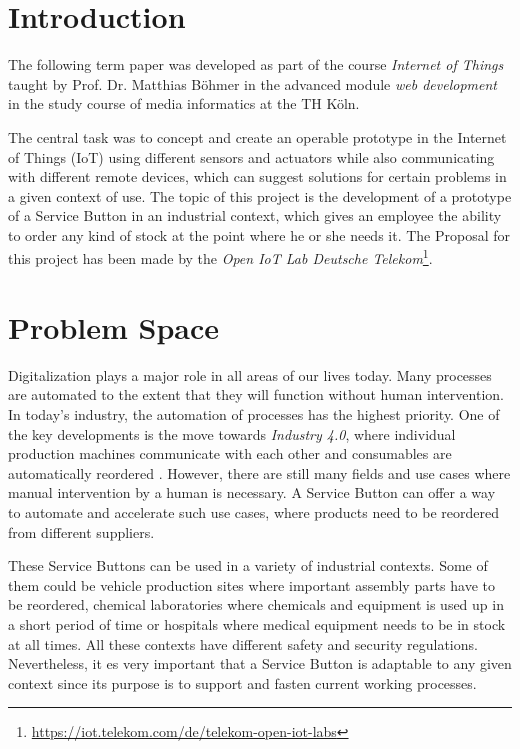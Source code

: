 \section{Introduction}
\label{sec:Intro}

The following term paper was developed as part of the course \textit{Internet of Things} taught by Prof. Dr. Matthias Böhmer in the advanced module \textit{web development} in the study course of media informatics at the TH Köln.

The central task was to concept and create an operable prototype in the Internet of Things (IoT) using different sensors and actuators while also communicating with different remote devices, which can suggest solutions for certain problems in a given context of use. The topic of this project is the development of a prototype of a Service Button in an industrial context, which gives an employee the ability to order any kind of stock at the point where he or she needs it. The Proposal for this project has been made by the \textit{Open IoT Lab Deutsche Telekom}\footnote{\url{https://iot.telekom.com/de/telekom-open-iot-labs}}.

\section{Problem Space}
\label{sec:Problem-Space}

Digitalization plays a major role in all areas of our lives today. Many processes are automated to the extent that they will function without human intervention. In today's industry, the automation of processes has the highest priority.
One of the key developments is the move towards \textit{Industry 4.0}, where individual production machines communicate with each other and consumables are automatically reordered \cite{Wollschlaeger:IoTIndustry4.0:2017}.
However, there are still many fields and use cases where manual intervention by a human is necessary. A Service Button can offer a way to automate and accelerate such use cases, where products need to be reordered from different suppliers.

These Service Buttons can be used in a variety of industrial contexts. Some of them could be vehicle production sites where important assembly parts have to be reordered, chemical laboratories where chemicals and equipment is used up in a short period of time or hospitals where medical equipment needs to be in stock at all times. All these contexts have different safety and security regulations. Nevertheless, it es very important that a Service Button is adaptable to any given context since its purpose is to support and fasten current working processes.

